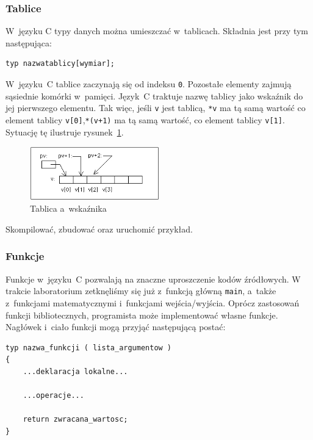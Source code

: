 \subsubsection{Tablice}

W~języku C typy danych można umieszczać w~tablicach. Składnia jest przy tym następująca: 

\begin{lstlisting}[style=MyCStyle]
typ nazwatablicy[wymiar];
\end{lstlisting}

W~języku~C tablice zaczynają się od indeksu \lstinline[style=MyCStyle]{0}. Pozostałe elementy zajmują sąsiednie komórki w~pamięci. Język~C traktuje nazwę tablicy jako wskaźnik do jej pierwszego elementu. Tak więc, jeśli \lstinline[style=MyCStyle]{v} jest tablicą, \lstinline[style=MyCStyle]{*v} ma tą samą wartość co element tablicy \lstinline[style=MyCStyle]{v[0]},\lstinline[style=MyCStyle]{*(v+1)} ma tą samą wartość, co element tablicy \lstinline[style=MyCStyle]{v[1]}. Sytuację tę ilustruje rysunek~\ref{fig:tablica}. 

\begin{figure}[!h]
\centering
\includegraphics[width=0.5\textwidth]{img/tablica}
\caption{Tablica a~wskaźnika}
\label{fig:tablica}
\end{figure}

Skompilować, zbudować oraz uruchomić przykład. 



\subsubsection{Funkcje}

Funkcje w~języku~C pozwalają na znaczne uproszczenie kodów źródłowych. W trakcie laboratorium zetknęliśmy się już z~funkcją główną \lstinline[style=MyCStyle]{main}, a~także z~funkcjami matematycznymi i~funkcjami wejścia/wyjścia. Oprócz zastosowań funkcji bibliotecznych, programista może implementować własne funkcje. Nagłówek i~ciało funkcji mogą przyjąć następującą postać:

\begin{lstlisting}[style=MyCStyle]
typ nazwa_funkcji ( lista_argumentow )
{
	...deklaracja lokalne...

	...operacje...

	return zwracana_wartosc;
}
\end{lstlisting}

